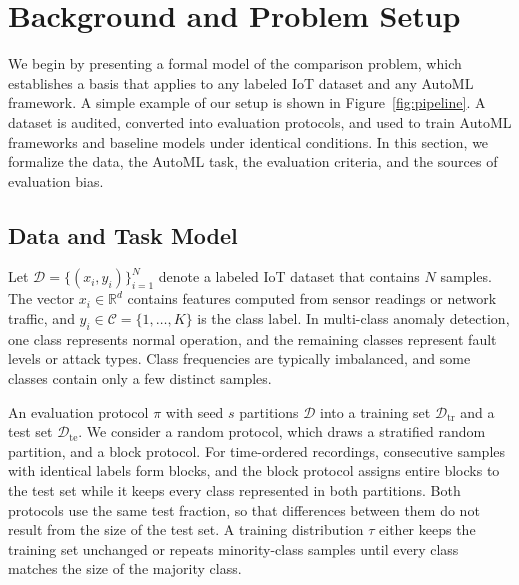 \section{Background and Problem Setup}\label{sec:background}
We begin by presenting a formal model of the comparison problem, which establishes a basis that applies to any labeled IoT dataset and any AutoML framework. A simple example of our setup is shown in Figure~\ref{fig:pipeline}. A dataset is audited, converted into evaluation protocols, and used to train AutoML frameworks and baseline models under identical conditions. In this section, we formalize the data, the AutoML task, the evaluation criteria, and the sources of evaluation bias.

\subsection{Data and Task Model}
Let $\mathcal{D}=\{(x_i,y_i)\}_{i=1}^{N}$ denote a labeled IoT dataset that contains $N$ samples. The vector $x_i\in\mathbb{R}^{d}$ contains features computed from sensor readings or network traffic, and $y_i\in\mathcal{C}=\{1,\dots,K\}$ is the class label. In multi-class anomaly detection, one class represents normal operation, and the remaining classes represent fault levels or attack types. Class frequencies are typically imbalanced, and some classes contain only a few distinct samples.

An evaluation protocol $\pi$ with seed $s$ partitions $\mathcal{D}$ into a training set $\mathcal{D}_{\mathrm{tr}}$ and a test set $\mathcal{D}_{\mathrm{te}}$. We consider a random protocol, which draws a stratified random partition, and a block protocol. For time-ordered recordings, consecutive samples with identical labels form blocks, and the block protocol assigns entire blocks to the test set while it keeps every class represented in both partitions. Both protocols use the same test fraction, so that differences between them do not result from the size of the test set. A training distribution $\tau$ either keeps the training set unchanged or repeats minority-class samples until every class matches the size of the majority class.

